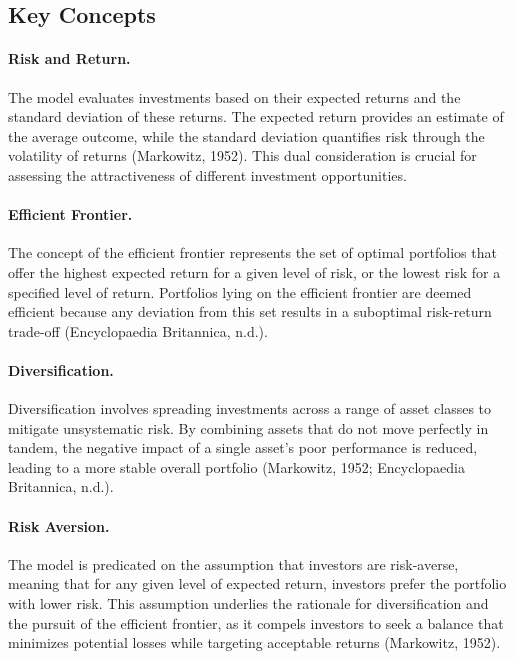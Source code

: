 \documentclass[11pt]{article}
\begin{document}
\subsection*{Key Concepts}
\paragraph{Risk and Return.} The model evaluates investments based on their expected returns and the standard deviation of these returns. The expected return provides an estimate of the average outcome, while the standard deviation quantifies risk through the volatility of returns (Markowitz, 1952). This dual consideration is crucial for assessing the attractiveness of different investment opportunities.

\paragraph{Efficient Frontier.} The concept of the efficient frontier represents the set of optimal portfolios that offer the highest expected return for a given level of risk, or the lowest risk for a specified level of return. Portfolios lying on the efficient frontier are deemed efficient because any deviation from this set results in a suboptimal risk-return trade-off (Encyclopaedia Britannica, n.d.).

\paragraph{Diversification.} Diversification involves spreading investments across a range of asset classes to mitigate unsystematic risk. By combining assets that do not move perfectly in tandem, the negative impact of a single asset’s poor performance is reduced, leading to a more stable overall portfolio (Markowitz, 1952; Encyclopaedia Britannica, n.d.).

\paragraph{Risk Aversion.} The model is predicated on the assumption that investors are risk-averse, meaning that for any given level of expected return, investors prefer the portfolio with lower risk. This assumption underlies the rationale for diversification and the pursuit of the efficient frontier, as it compels investors to seek a balance that minimizes potential losses while targeting acceptable returns (Markowitz, 1952).
\end{document}
